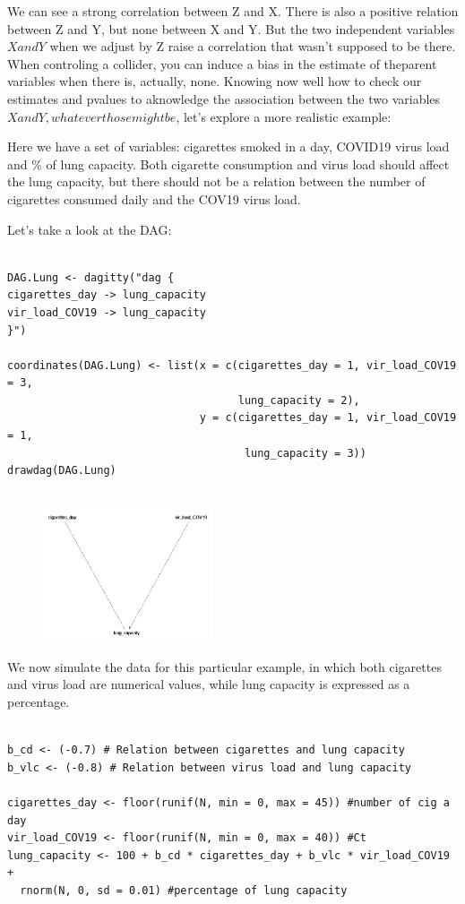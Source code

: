 \documentclass{article}
\begin{document}
We can see a strong correlation between Z and X. There is also a positive relation between Z and Y, but none between X and Y. But the two independent  variables \(X and Y\) when we adjust by Z raise a correlation that wasn't supposed to be there.
When controling a collider, you can induce a bias in the estimate of theparent variables when there is, actually, none.
Knowing now well how to check our estimates and pvalues to aknowledge the association between the two variables \( X and Y, whatever those might be \), let's explore a more realistic example:

Here we have a set of variables: cigarettes smoked in a day, COVID19 virus load and \% of lung capacity. Both cigarette consumption and virus load should affect the lung capacity, but there should not be a relation between the number of cigarettes consumed daily and the COV19 virus load.

Let's take a look at the DAG:

\begin{lstlisting}

DAG.Lung <- dagitty("dag {
cigarettes_day -> lung_capacity
vir_load_COV19 -> lung_capacity
}")

coordinates(DAG.Lung) <- list(x = c(cigarettes_day = 1, vir_load_COV19 = 3, 
                                    lung_capacity = 2),
                              y = c(cigarettes_day = 1, vir_load_COV19 = 1,
                                     lung_capacity = 3))
drawdag(DAG.Lung)


\end{lstlisting}


\begin{figure}[h]
\includegraphics[width=5cm]{DAG_CIG_LUNG.png}
\centering
\end{figure}
We now simulate the data for this particular example, in which both cigarettes and virus load are numerical values, while lung capacity is expressed as a percentage.
\begin{lstlisting}

b_cd <- (-0.7) # Relation between cigarettes and lung capacity
b_vlc <- (-0.8) # Relation between virus load and lung capacity 

cigarettes_day <- floor(runif(N, min = 0, max = 45)) #number of cig a day
vir_load_COV19 <- floor(runif(N, min = 0, max = 40)) #Ct
lung_capacity <- 100 + b_cd * cigarettes_day + b_vlc * vir_load_COV19 + 
  rnorm(N, 0, sd = 0.01) #percentage of lung capacity

\end{lstlisting}
\end{document}
